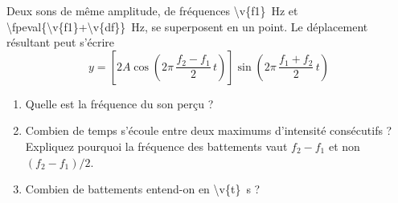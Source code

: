 Deux sons de même amplitude, de fréquences \qty{\v{f1}}{Hz} et \qty{\fpeval{\v{f1}+\v{df}}}{Hz}, se superposent en un point. Le déplacement résultant peut s'écrire
\[ y = \left[2A\cos\left(2\pi\,\frac{f_2 - f_1}{2}\,t\right)\right]\sin\left(2\pi\,\frac{f_1 + f_2}{2}\,t\right) \]

\begin{enumerate}[label=\alph*)]
    \item Quelle est la fréquence du son perçu ?
    \item Combien de temps s'écoule entre deux maximums d'intensité consécutifs ? Expliquez pourquoi la fréquence des battements vaut $f_2 - f_1$ et non $(f_2 - f_1)/2$.
    \item Combien de battements entend-on en \qty{\v{t}}{s} ?
\end{enumerate}

